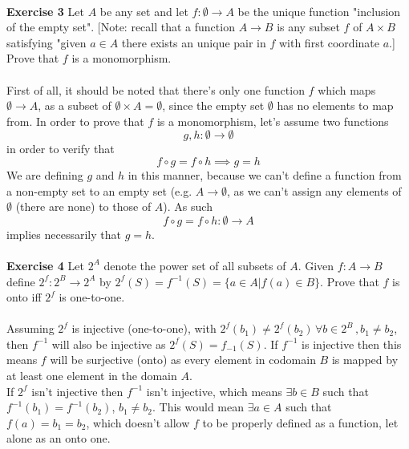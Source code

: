 \documentclass[a4paper,12pt,twoside,leqno]{article}
\begin{document}
\paragraph*{}
\textbf{Exercise 3} Let $A$ be any set and let $f: \emptyset \rightarrow A$ be the unique function "inclusion of the empty set". [Note: recall that a function $A \rightarrow B$ is any subset $f$ of $A \times B$ satisfying "given $a \in A$ there exists an unique pair in $f$ with first coordinate $a$.] Prove that $f$ is a monomorphism.\paragraph*{}
First of all, it should be noted that there's only one function $f$ which maps $\emptyset \rightarrow A$, as a subset of $\emptyset \times A = \emptyset$, since the empty set $\emptyset$ has no elements to map from. In order to prove that $f$ is a monomorphism, let's assume two functions
$$
g, h: \emptyset \rightarrow \emptyset
$$
in order to verify that
$$
f \circ g = f \circ h \implies g = h
$$
We are defining $g$ and $h$ in this manner, because we can't define a function from a non-empty set to an empty set (e.g. $A \rightarrow \emptyset$, as we can't assign any elements of $\emptyset$ (there are none) to those of $A$). As such
$$
f \circ g = f \circ h: \emptyset \rightarrow A
$$
implies necessarily that $g = h$.
\paragraph*{}
\textbf{Exercise 4} Let $2^A$ denote the power set of all subsets of $A$. Given $f: A \rightarrow B$ define $2^f: 2^B \rightarrow 2^A$ by $2^f(S) = f^{-1}(S) = \lbrace a \in A | f(a) \in B \rbrace$. Prove that $f$ is onto iff $2^f$ is one-to-one.\paragraph*{}
Assuming $2^f$ is injective (one-to-one), with $2^f(b_1) \neq 2^f(b_2)\,  \forall b \in 2^B\, , b_1 \neq b_2$, then $f^{-1}$ will also be injective as $2^f(S) = f_{-1}(S)$. If $f^{-1}$ is injective then this means $f$ will be surjective (onto) as every element in codomain $B$ is mapped by at least one element in the domain $A$.\\
If $2^f$ isn't injective then $f^{-1}$ isn't injective, which means $\exists b \in B$ such that $f^{-1}(b_1) = f^{-1}(b_2)$, $b_1 \neq b_2$. This would mean $\exists a \in A$ such that $f(a) = b_1 = b_2$, which doesn't allow $f$ to be properly defined as a function, let alone as an onto one.
\end{document}

